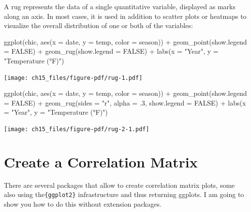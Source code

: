 \documentclass[
  letterpaper,
]{scrbook}
\newenvironment{Shaded}{\begin{snugshade}}{\end{snugshade}}
\newcommand{\AttributeTok}[1]{\textcolor[rgb]{0.40,0.45,0.13}{#1}}
\newcommand{\ConstantTok}[1]{\textcolor[rgb]{0.56,0.35,0.01}{#1}}
\newcommand{\DecValTok}[1]{\textcolor[rgb]{0.68,0.00,0.00}{#1}}
\newcommand{\FunctionTok}[1]{\textcolor[rgb]{0.28,0.35,0.67}{#1}}
\newcommand{\NormalTok}[1]{\textcolor[rgb]{0.00,0.23,0.31}{#1}}
\newcommand{\SpecialCharTok}[1]{\textcolor[rgb]{0.37,0.37,0.37}{#1}}
\newcommand{\StringTok}[1]{\textcolor[rgb]{0.13,0.47,0.30}{#1}}
\begin{document}
A rug represents the data of a single quantitative variable, displayed
as marks along an axis. In most cases, it is used in addition to scatter
plots or heatmaps to visualize the overall distribution of one or both
of the variables:

\begin{Shaded}
\begin{Highlighting}[]
\FunctionTok{ggplot}\NormalTok{(chic, }\FunctionTok{aes}\NormalTok{(}\AttributeTok{x =}\NormalTok{ date, }\AttributeTok{y =}\NormalTok{ temp,}
                 \AttributeTok{color =}\NormalTok{ season)) }\SpecialCharTok{+}
  \FunctionTok{geom\_point}\NormalTok{(}\AttributeTok{show.legend =} \ConstantTok{FALSE}\NormalTok{) }\SpecialCharTok{+}
  \FunctionTok{geom\_rug}\NormalTok{(}\AttributeTok{show.legend =} \ConstantTok{FALSE}\NormalTok{) }\SpecialCharTok{+}
  \FunctionTok{labs}\NormalTok{(}\AttributeTok{x =} \StringTok{"Year"}\NormalTok{, }\AttributeTok{y =} \StringTok{"Temperature (°F)"}\NormalTok{)}
\end{Highlighting}
\end{Shaded}

\texttt{[image: ch15\_files/figure-pdf/rug-1.pdf]}

\begin{Shaded}
\begin{Highlighting}[]
\FunctionTok{ggplot}\NormalTok{(chic, }\FunctionTok{aes}\NormalTok{(}\AttributeTok{x =}\NormalTok{ date, }\AttributeTok{y =}\NormalTok{ temp, }\AttributeTok{color =}\NormalTok{ season)) }\SpecialCharTok{+}
  \FunctionTok{geom\_point}\NormalTok{(}\AttributeTok{show.legend =} \ConstantTok{FALSE}\NormalTok{) }\SpecialCharTok{+}
  \FunctionTok{geom\_rug}\NormalTok{(}\AttributeTok{sides =} \StringTok{"r"}\NormalTok{, }\AttributeTok{alpha =}\NormalTok{ .}\DecValTok{3}\NormalTok{, }\AttributeTok{show.legend =} \ConstantTok{FALSE}\NormalTok{) }\SpecialCharTok{+}
  \FunctionTok{labs}\NormalTok{(}\AttributeTok{x =} \StringTok{"Year"}\NormalTok{, }\AttributeTok{y =} \StringTok{"Temperature (°F)"}\NormalTok{)}
\end{Highlighting}
\end{Shaded}

\texttt{[image: ch15\_files/figure-pdf/rug-2-1.pdf]}

\section{Create a Correlation Matrix}\label{create-a-correlation-matrix}

There are several packages that allow to create correlation matrix
plots, some also using the\texttt{\{ggplot2\}} infrastructure and thus
returning ggplots. I am going to show you how to do this without
extension packages.
\end{document}

